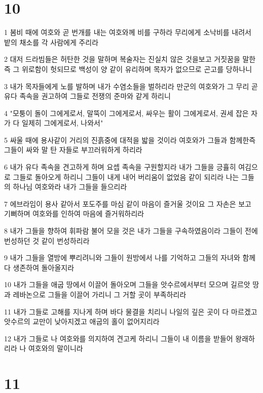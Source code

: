 \chapter{10}

\par 1 봄비 때에 여호와 곧 번개를 내는 여호와께 비를 구하라 무리에게 소낙비를 내려서 밭의 채소를 각 사람에게 주리라
\par 2 대저 드라빔들은 허탄한 것을 말하며 복술자는 진실치 않은 것을보고 거짓꿈을 말한즉 그 위로함이 헛되므로 백성이 양 같이 유리하며 목자가 없으므로 곤고를 당하나니
\par 3 내가 목자들에게 노를 발하며 내가 수염소들을 벌하리라 만군의 여호와가 그 무리 곧 유다 족속을 권고하여 그들로 전쟁의 준마와 같게 하리니
\par 4 "모퉁이 돌이 그에게로서, 말뚝이 그에게로서, 싸우는 활이 그에게로서, 권세 잡은 자가 다 일제히 그에게로서, 나와서"
\par 5 싸울 때에 용사같이 거리의 진흙중에 대적을 밟을 것이라 여호와가 그들과 함께한즉 그들이 싸와 말 탄 자들로 부끄러워하게 하리라
\par 6 내가 유다 족속을 견고하게 하며 요셉 족속을 구원할지라 내가 그들을 긍휼히 여김으로 그들로 돌아오게 하리니 그들이 내게 내어 버리움이 없었음 같이 되리라 나는 그들의 하나님 여호와라 내가 그들을 들으리라
\par 7 에브라임이 용사 같아서 포도주를 마심 같이 마음이 즐거울 것이요 그 자손은 보고 기뻐하며 여호와를 인하여 마음에 즐거워하리라
\par 8 내가 그들을 향하여 휘파람 불어 모을 것은 내가 그들을 구속하였음이라 그들이 전에 번성하던 것 같이 번성하리라
\par 9 내가 그들을 열방에 뿌리려니와 그들이 원방에서 나를 기억하고 그들의 자녀와 함께 다 생존하여 돌아올지라
\par 10 내가 그들을 애굽 땅에서 이끌어 돌아오며 그들을 앗수르에서부터 모으며 길르앗 땅과 레바논으로 그들을 이끌어 가리니 그 거할 곳이 부족하리라
\par 11 내가 그들로 고해를 지나게 하며 바다 물결을 치리니 나일의 깊은 곳이 다 마르겠고 앗수르의 교만이 낮아지겠고 애굽의 홀이 없어지리라
\par 12 내가 그들로 나 여호와를 의지하여 견고케 하리니 그들이 내 이름을 받들어 왕래하리라 나 여호와의 말이니라

\chapter{11}

